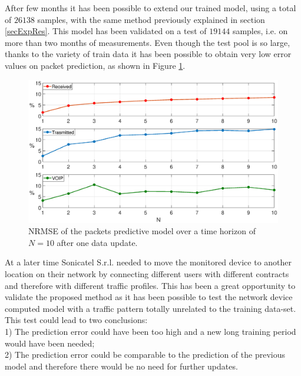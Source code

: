 After few months it has been possible to extend our trained model, using a total of $26138$ samples, with the same method previously explained in section \ref{secExpRes}. This model has been validated on a test of $19144$ samples, i.e. on more than two months of measurements. Even though the test pool is so large, thanks to the variety of train data it has been possible to obtain very low error values on packet prediction, as shown in Figure \ref{fig:{LONGTEST_Pescara}}.
\begin{figure}[H]
	\centering
	\includegraphics[trim={120 0 120 0}, width=1\linewidth]{figure/LONGTEST_PESCARA.eps}
	\caption{NRMSE of the packets predictive model over a time horizon of $N=10$ after one data update.}
	\label{fig:{LONGTEST_Pescara}}
\end{figure}
At a later time Sonicatel S.r.l. needed to move the monitored device to another location on their network by connecting different users with different contracts and therefore with different traffic profiles. This has been a great opportunity to validate the proposed method as it has been possible to test the network device computed model with a traffic pattern totally unrelated to the training data-set. This test could lead to two conclusions:\\
1) The prediction error could have been too high and a new long training period would have been needed;\\
2) The prediction error could be comparable to the prediction of the previous model and therefore there would be no need for further updates.\\
